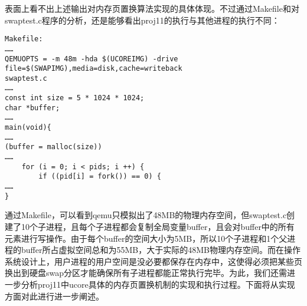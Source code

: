 表面上看不出上述输出对内存页置换算法实现的具体体现。不过通过Makefile和对swaptest.c程序的分析，还是能够看出proj11的执行与其他进程的执行不同：

\begin{lstlisting}
Makefile:
……
QEMUOPTS = -m 48m -hda $(UCOREIMG) -drive file=$(SWAPIMG),media=disk,cache=writeback
swaptest.c
……
const int size = 5 * 1024 * 1024;
char *buffer;
……
main(void){
……
(buffer = malloc(size))
……
    for (i = 0; i < pids; i ++) {
        if ((pid[i] = fork()) == 0) {
……
}
\end{lstlisting}

通过Makefile，可以看到qemu只模拟出了48MB的物理内存空间，但swaptest.c创建了10个子进程，且每个子进程都会复制全局变量buffer，且会对buffer中的所有元素进行写操作。由于每个buffer的空间大小为5MB，所以10个子进程和1个父进程的buffer所占虚拟空间总和为55MB，大于实际的48MB物理内存空间。而在操作系统设计上，用户进程的用户空间是没必要都保存在内存中，这使得必须把某些页换出到硬盘swap分区才能确保所有子进程都能正常执行完毕。为此，我们还需进一步分析proj11中ucore具体的内存页置换机制的实现和执行过程。下面将从实现方面对此进行进一步阐述。
